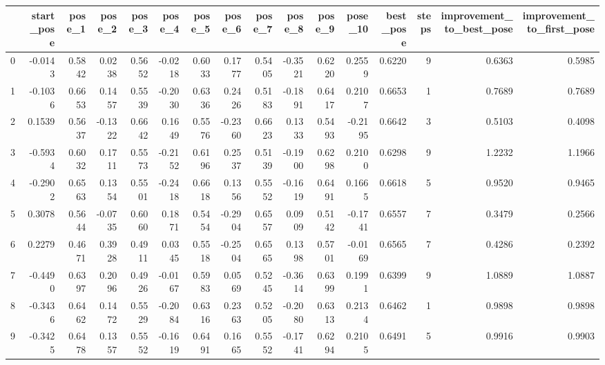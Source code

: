 \begin{tabular}{lrrrrrrrrrrrrrrr}
\toprule
{} &  start\_pose &  pose\_1 &  pose\_2 &  pose\_3 &  pose\_4 &  pose\_5 &  pose\_6 &  pose\_7 &  pose\_8 &  pose\_9 &  pose\_10 &  best\_pose &  steps &  improvement\_to\_best\_pose &  improvement\_to\_first\_pose \\
\midrule
0 &     -0.0143 &  0.5842 &  0.0238 &  0.5652 & -0.0218 &  0.6033 &  0.1777 &  0.5405 & -0.3521 &  0.6220 &   0.2559 &     0.6220 &      9 &                    0.6363 &                     0.5985 \\
1 &     -0.1036 &  0.6653 &  0.1457 &  0.5539 & -0.2030 &  0.6336 &  0.2426 &  0.5183 & -0.1891 &  0.6417 &   0.2107 &     0.6653 &      1 &                    0.7689 &                     0.7689 \\
2 &      0.1539 &  0.5637 & -0.1322 &  0.6642 &  0.1649 &  0.5576 & -0.2360 &  0.6623 &  0.1333 &  0.5493 &  -0.2195 &     0.6642 &      3 &                    0.5103 &                     0.4098 \\
3 &     -0.5934 &  0.6032 &  0.1711 &  0.5573 & -0.2152 &  0.6196 &  0.2537 &  0.5139 & -0.1900 &  0.6298 &   0.2100 &     0.6298 &      9 &                    1.2232 &                     1.1966 \\
4 &     -0.2902 &  0.6563 &  0.1354 &  0.5501 & -0.2418 &  0.6618 &  0.1356 &  0.5552 & -0.1619 &  0.6491 &   0.1665 &     0.6618 &      5 &                    0.9520 &                     0.9465 \\
5 &      0.3078 &  0.5644 & -0.0735 &  0.6060 &  0.1871 &  0.5454 & -0.2904 &  0.6557 &  0.0909 &  0.5142 &  -0.1741 &     0.6557 &      7 &                    0.3479 &                     0.2566 \\
6 &      0.2279 &  0.4671 &  0.3928 &  0.4911 &  0.0345 &  0.5518 & -0.2504 &  0.6565 &  0.1398 &  0.5701 &  -0.0169 &     0.6565 &      7 &                    0.4286 &                     0.2392 \\
7 &     -0.4490 &  0.6397 &  0.2096 &  0.4926 & -0.0167 &  0.5983 &  0.0569 &  0.5245 & -0.3614 &  0.6399 &   0.1991 &     0.6399 &      9 &                    1.0889 &                     1.0887 \\
8 &     -0.3436 &  0.6462 &  0.1472 &  0.5529 & -0.2084 &  0.6316 &  0.2363 &  0.5205 & -0.2080 &  0.6313 &   0.2134 &     0.6462 &      1 &                    0.9898 &                     0.9898 \\
9 &     -0.3425 &  0.6478 &  0.1357 &  0.5552 & -0.1619 &  0.6491 &  0.1665 &  0.5552 & -0.1741 &  0.6294 &   0.2105 &     0.6491 &      5 &                    0.9916 &                     0.9903 \\
\bottomrule
\end{tabular}
